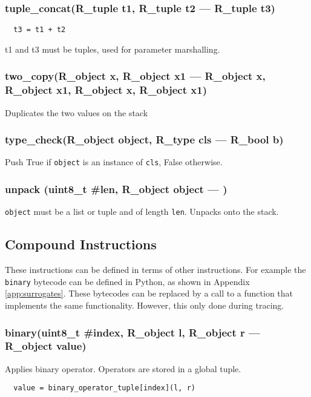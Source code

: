\subsubsection{tuple\_concat(R\_tuple t1, R\_tuple t2 --- R\_tuple t3)}
\vspace{-1em}\begin{verbatim}
  t3 = t1 + t2
\end{verbatim}
\vspace{-1em}t1 and t3 must be tuples, used for parameter marshalling. \vspace{-1em}
\subsubsection{two\_copy(R\_object x, R\_object x1 --- R\_object x, R\_object x1, R\_object x, R\_object x1)}
\vspace{-1em}Duplicates the two values on the stack \vspace{-1em}
\subsubsection{type\_check(R\_object object, R\_type cls --- R\_bool b)}
\vspace{-1em}Push True if \texttt{object} is an instance of \texttt{cls}, False otherwise. \vspace{-1em}
\subsubsection{unpack (uint8\_t \#len, R\_object object --- )}
\vspace{-1em}\texttt{object} must be a list or tuple and of length \texttt{len}. Unpacks onto the stack. \vspace{-1em}
\subsection{Compound Instructions}

    These instructions can be defined in terms of other instructions.
    For example the \verb|binary| bytecode can be defined in Python, 
    as shown in Appendix \ref{app:surrogates}.
    These bytecodes can be replaced by a call to a function that 
    implements the same functionality. However, this only done during tracing.

\subsubsection{binary(uint8\_t \#index, R\_object l, R\_object r --- R\_object value)}
\vspace{-1em}Applies binary operator. Operators are stored in a global tuple. \vspace{-1em}\begin{verbatim}
  value = binary_operator_tuple[index](l, r)
\end{verbatim}
\vspace{-1em}\vspace{-1em}
